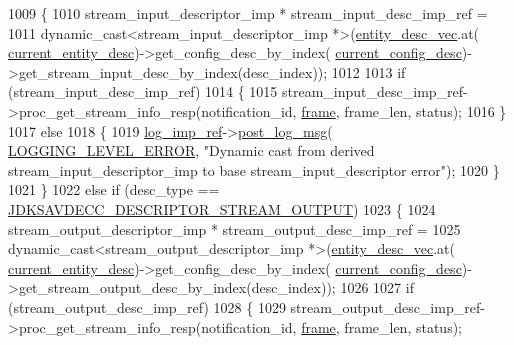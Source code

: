 \begin{DoxyCode}
{{1009         \{
1010             stream\_input\_descriptor\_imp * stream\_input\_desc\_imp\_ref =
1011                 \textcolor{keyword}{dynamic\_cast<}stream\_input\_descriptor\_imp *\textcolor{keyword}{>}(\hyperlink{classavdecc__lib_1_1end__station__imp_a72edab41bc56e3c1757944a7df188a3d}{entity\_desc\_vec}.at(
      \hyperlink{classavdecc__lib_1_1end__station__imp_afd78c89df26ba7641e1adb764c0e827d}{current\_entity\_desc})->get\_config\_desc\_by\_index(
      \hyperlink{classavdecc__lib_1_1end__station__imp_a60b1af40d35e8a86b0082c54ab6cb6a8}{current\_config\_desc})->get\_stream\_input\_desc\_by\_index(desc\_index));
1012 
1013             \textcolor{keywordflow}{if} (stream\_input\_desc\_imp\_ref)
1014             \{
1015                 stream\_input\_desc\_imp\_ref->proc\_get\_stream\_info\_resp(notification\_id, 
      \hyperlink{gst__avb__playbin_8c_ac8e710e0b5e994c0545d75d69868c6f0}{frame}, frame\_len, status);
1016             \}
1017             \textcolor{keywordflow}{else}
1018             \{
1019                 \hyperlink{namespaceavdecc__lib_acbe3e2a96ae6524943ca532c87a28529}{log\_imp\_ref}->\hyperlink{classavdecc__lib_1_1log_a68139a6297697e4ccebf36ccfd02e44a}{post\_log\_msg}(
      \hyperlink{namespaceavdecc__lib_a501055c431e6872ef46f252ad13f85cdaf2c4481208273451a6f5c7bb9770ec8a}{LOGGING\_LEVEL\_ERROR}, \textcolor{stringliteral}{"Dynamic cast from derived stream\_input\_descriptor\_imp to base
       stream\_input\_descriptor error"});
1020             \}
1021         \}
1022         \textcolor{keywordflow}{else} \textcolor{keywordflow}{if} (desc\_type == \hyperlink{group__descriptor_gab458eb4963f42bfa5591d5dd604bedce}{JDKSAVDECC\_DESCRIPTOR\_STREAM\_OUTPUT})
1023         \{
1024             stream\_output\_descriptor\_imp * stream\_output\_desc\_imp\_ref =
1025                 \textcolor{keyword}{dynamic\_cast<}stream\_output\_descriptor\_imp *\textcolor{keyword}{>}(\hyperlink{classavdecc__lib_1_1end__station__imp_a72edab41bc56e3c1757944a7df188a3d}{entity\_desc\_vec}.at(
      \hyperlink{classavdecc__lib_1_1end__station__imp_afd78c89df26ba7641e1adb764c0e827d}{current\_entity\_desc})->get\_config\_desc\_by\_index(
      \hyperlink{classavdecc__lib_1_1end__station__imp_a60b1af40d35e8a86b0082c54ab6cb6a8}{current\_config\_desc})->get\_stream\_output\_desc\_by\_index(desc\_index));
1026 
1027             \textcolor{keywordflow}{if} (stream\_output\_desc\_imp\_ref)
1028             \{
1029                 stream\_output\_desc\_imp\_ref->proc\_get\_stream\_info\_resp(notification\_id, 
      \hyperlink{gst__avb__playbin_8c_ac8e710e0b5e994c0545d75d69868c6f0}{frame}, frame\_len, status);
}}
\end{DoxyCode}
